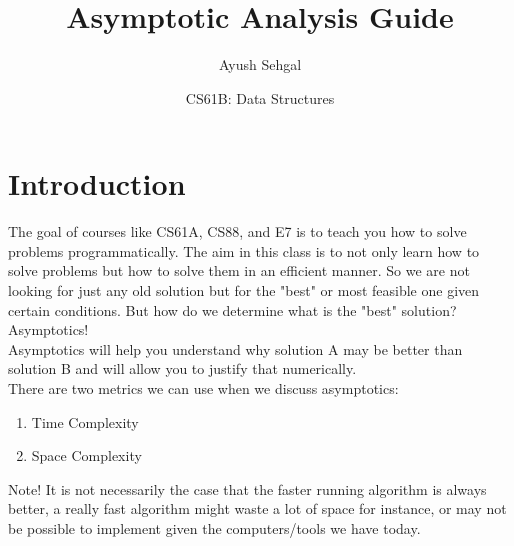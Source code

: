 \documentclass{article}
\title{Asymptotic Analysis Guide}
\author{Ayush Sehgal}
\date{CS61B: Data Structures}
\begin{document}
\maketitle

\section{Introduction}
The goal of courses like CS61A, CS88, and E7 is to teach you how to solve problems programmatically. The aim in this class is to not only learn how to solve problems but how to solve them in an efficient manner. So we are not looking for just any old solution but for the "best" or most feasible one given certain conditions. But how do we determine what is the "best" solution? Asymptotics! \\
Asymptotics will help you understand why solution A may be better than solution B and will allow you to justify that numerically. \\
There are two metrics we can use when we discuss asymptotics: 
\begin{enumerate}
    \item Time Complexity
    \item Space Complexity
\end{enumerate}
Note! It is not necessarily the case that the faster running algorithm is always better, a really fast algorithm might waste a lot of space for instance, or may not be possible to implement given the computers/tools we have today. 
\end{document}

